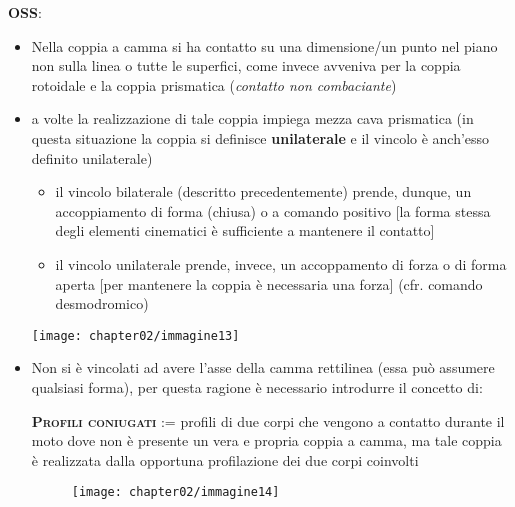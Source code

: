 \vspace{2mm}
\textbf{OSS}: \begin{itemize}
\item Nella coppia a camma si ha contatto su una dimensione/un punto nel piano non sulla linea o tutte le superfici, come invece avveniva per la coppia rotoidale e la coppia prismatica (\emph{contatto non combaciante})	
\item a volte la realizzazione di tale coppia impiega mezza cava prismatica (in questa situazione la coppia si definisce \textbf{unilaterale} e il vincolo è anch'esso definito unilaterale)

\begin{minipage}{.65\textwidth}
	\begin{itemize}
		\item il vincolo bilaterale (descritto precedentemente) prende, dunque, un accoppiamento di forma (chiusa) o a comando positivo [la forma stessa degli elementi cinematici è sufficiente a mantenere il contatto]
		\item il vincolo unilaterale prende, invece, un accoppamento di forza o di forma aperta [per mantenere la coppia è necessaria una forza]
			(cfr. comando desmodromico)
	\end{itemize}
	\end{minipage}
	\hfill
	\begin{minipage}{.35\textwidth}
	\centering
	\texttt{[image: chapter02/immagine13]}
	\end{minipage}

\item Non si è vincolati ad avere l'asse della camma rettilinea (essa può assumere qualsiasi forma), per questa ragione è necessario introdurre il concetto di:

{\scshape{\bfseries Profili coniugati}} := profili di due corpi che vengono a contatto durante il moto dove non è presente un vera e propria coppia a camma, ma tale coppia è realizzata dalla opportuna profilazione dei due corpi coinvolti

\begin{figure}[h]
\centering
\texttt{[image: chapter02/immagine14]}
 \end{figure}
 


\end{itemize}
